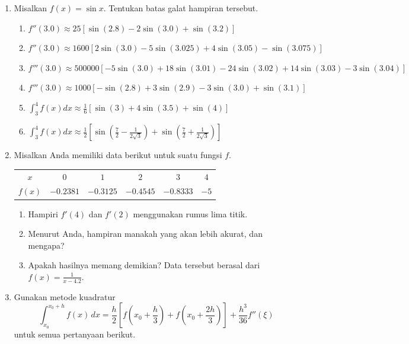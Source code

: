 \begin{small}
\begin{enumerate}
\begin{enumerate}
\item Hitung galat (bukan batas galat) ketika menaksir $f'(2)$ menggunakan
beda maju
\[
\frac{f(x_{0}+h)-f(x_{0})}{h}
\]
dengan $h=0.1$.
\item Tentukan $\xi_{0.1}$ yang keberadaannya dijamin oleh suku galat.
\end{enumerate}
\item Misalkan $f(x)=\sin x$.  Tentukan batas galat hampiran tersebut.

\begin{enumerate}
\item \label{exc:calculusErrors-29}${\displaystyle f''(3.0)\approx25[\sin(2.8)-2\sin(3.0)+\sin(3.2)]}$ \hasananswer 
\item ${\displaystyle f''(3.0)\approx1600\left[2\sin(3.0)-5\sin(3.025)+4\sin(3.05)-\sin(3.075)\right]}$
\item \label{exc:calculusErrors-13}$f'''(3.0)\approx500000\left[-5\sin(3.0)+18\sin(3.01)-24\sin(3.02)+14\sin(3.03)-3\sin(3.04)\right]$ \hasasolution 
\item ${\displaystyle f'''(3.0)\approx1000\left[-\sin(2.8)+3\sin(2.9)-3\sin(3.0)+\sin(3.1)\right]}$
\item ${\displaystyle \int_{3}^{4}f(x)dx\approx\frac{1}{6}\left[\sin(3)+4\sin(3.5)+\sin(4)\right]}$
\item \label{exc:calculusErrors-14}${\displaystyle \int_{3}^{4}f(x)dx\approx\frac{1}{2}\left[\sin\left(\frac{7}{2}-\frac{1}{2\sqrt{3}}\right)+\sin\left(\frac{7}{2}+\frac{1}{2\sqrt{3}}\right)\right]}$ \hasasolution 
\end{enumerate}
\item \label{exc:calculusErrors-18}Misalkan Anda memiliki data berikut
untuk suatu fungsi $f$. \hasasolution 

\begin{center}
\begin{tabular}{cccccc}
$x$ & $0$ & $1$ & $2$ & $3$ & $4$\tabularnewline
$f(x)$ & $-0.2381$ & $-0.3125$ & $-0.4545$ & $-0.8333$ & $-5$\tabularnewline
\end{tabular}
\par\end{center}
\begin{enumerate}
\item Hampiri $f'(4)$ dan $f'(2)$ menggunakan rumus lima titik. 
\item Menurut Anda, hampiran manakah yang akan lebih akurat, dan mengapa?
\item Apakah hasilnya memang demikian? Data tersebut berasal dari $f(x)=\frac{1}{x-4.2}$.
\end{enumerate}
\item \label{exc:calculusErrors-30}Gunakan metode kuadratur 
\[
\int_{x_{0}}^{x_{0}+h}f(x)\,dx=\frac{h}{2}\left[f\left(x_{0}+\frac{h}{3}\right)+f\left(x_{0}+\frac{2h}{3}\right)\right]+\frac{h^{3}}{36}f''(\xi)
\]
untuk semua pertanyaan berikut. \hasananswer 


\end{enumerate}
\end{small}
